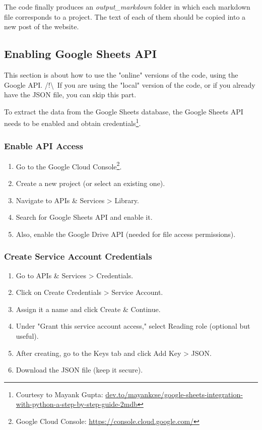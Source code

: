 The code finally produces an \textit{output\_markdown} folder in which each markdown file corresponds to a project. The text of each of them should be copied into a new post of the website.

\subsection{Enabling Google Sheets API}\label{ssec:API}
This section is about how to use the "online" versions of the code, using the Google API.
/!\textbackslash \ If you are using the "local" version of the code, or if you already have the JSON file, you can skip this part.

To extract the data from the Google Sheets database, the Google Sheets API needs to be enabled and obtain credentials\footnote{Courtesy to Mayank Gupta: \href{https://dev.to/mayankcse/google-sheets-integration-with-python-a-step-by-step-guide-2mdb}{dev.to/mayankcse/google-sheets-integration-with-python-a-step-by-step-guide-2mdb}}.

\subsubsection*{Enable API Access}

\begin{enumerate}
    \item Go to the Google Cloud Console\footnote{Google Cloud Console: \href{https://console.cloud.google.com/}{https://console.cloud.google.com/}}.
    \item Create a new project (or select an existing one).
    \item Navigate to APIs \& Services > Library.
    \item Search for Google Sheets API and enable it.
    \item Also, enable the Google Drive API (needed for file access permissions).
\end{enumerate}

\subsubsection*{Create Service Account Credentials}

\begin{enumerate}
    \item Go to APIs \& Services > Credentials.
    \item Click on Create Credentials > Service Account.
    \item Assign it a name and click Create \& Continue.
    \item Under "Grant this service account access," select Reading role (optional but useful).
    \item After creating, go to the Keys tab and click Add Key > JSON.
    \item Download the JSON file (keep it secure).
\end{enumerate}

